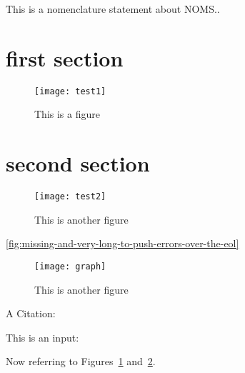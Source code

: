 \documentclass[
    letterpaper %
]{article}
\begin{document}
This is a nomenclature statement about NOMS..

\tableofcontents
\listoffigures

\section{first section}

\printglossary

\nocite{testentry3}

\begin{figure}
\centering
    \texttt{[image: test1]}
\caption{This is a figure}
\label{fig:test1}
\end{figure}

\section{second section}

\begin{figure}
\centering
    \texttt{[image: test2]}
\caption{This is another figure}
\label{fig:test2}
\end{figure}

\ref{fig:missing-and-very-long-to-push-errors-over-the-eol}

\begin{figure}
\centering
    \texttt{[image: graph]}
\caption{This is another figure}
\label{fig:test3}
\end{figure}

A Citation: \cite{testentry}

This is an input: {}




Now referring to Figures~\ref{fig:test1} and~\ref{fig:test2}.
\end{document}
